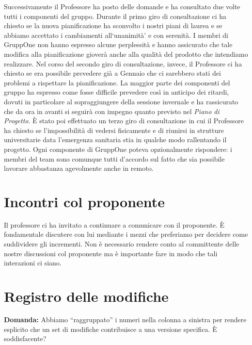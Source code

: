 \documentclass{article}
\begin{document}
Successivamente il Professore ha posto delle domande e ha consultato due volte tutti i componenti del gruppo.
Durante il primo giro di consultazione ci ha chiesto se la nuova pianificazione ha sconvolto i nostri piani di laurea e se abbiamo accettato i cambiamenti all`unanimità' e con serenità.
I membri di GruppOne non hanno espresso alcune perplessità e hanno assicurato che tale modifica alla pianificazione gioverà anche alla qualità del prodotto che intendiamo realizzare.
Nel corso del secondo giro di consultazione, invece, il Professore ci ha chiesto se era possibile prevedere già a Gennaio che ci sarebbero stati dei problemi a rispettare la pianificazione.
La maggior parte dei componenti del gruppo ha espresso come fosse difficile prevedere così in anticipo dei ritardi, dovuti in particolare al sopraggiungere della sessione invernale e ha rassicurato che da ora in avanti si seguirà con impegno quanto previsto nel \textit{Piano di Progetto}.
È stato poi effettuato un terzo giro di consultazione in cui il Professore ha chiesto se l'impossibilità di vedersi fisicamente e di riunirsi in strutture universitarie data l'emergenza sanitaria stia in qualche modo rallentando il progetto. Ogni componente di GruppOne poteva opzionalmente rispondere: i membri del team sono comunque tutti d'accordo sul fatto che sia possibile lavorare abbastanza agevolmente anche in remoto.

\section{Incontri col proponente}%
\label{sec:incontri_col_proponente}

Il professore ci ha invitato a continuare a comunicare con il proponente.
È fondamentale discutere con lui mediante i mezzi che preferiamo per decidere come suddividere gli incrementi.
Non è necessario rendere conto al committente delle nostre discussioni col proponente ma è importante fare in modo che tali interazioni ci siano.

\section{Registro delle modifiche}%
\label{sec:registro_delle_modifiche}

\textbf{Domanda:} Abbiamo ``raggruppato'' i numeri nella colonna a sinistra per rendere esplicito che un set di modifiche contribuisce a una versione specifica. È soddisfacente?\\
\end{document}
